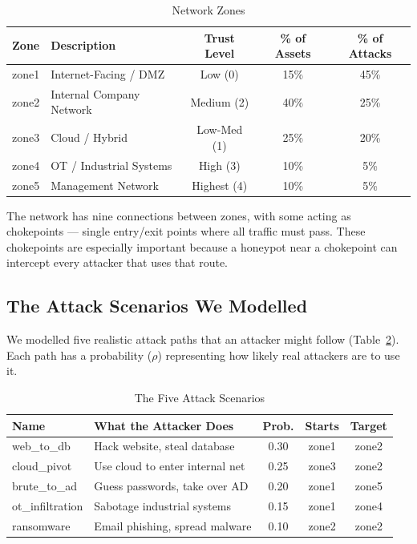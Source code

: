 \documentclass[journal]{IEEEtran}
\begin{document}
\begin{table}[htbp]
\caption{Network Zones}
\label{tab:zones}
\centering
\renewcommand{\arraystretch}{1.2}
\begin{tabular}{@{}llccc@{}}
\toprule
\textbf{Zone} & \textbf{Description} &
\textbf{Trust Level} & \textbf{\% of Assets} & \textbf{\% of Attacks} \\
\midrule
zone1 & Internet-Facing / DMZ    & Low (0)       & 15\% & 45\% \\
zone2 & Internal Company Network & Medium (2)    & 40\% & 25\% \\
zone3 & Cloud / Hybrid           & Low-Med (1)   & 25\% & 20\% \\
zone4 & OT / Industrial Systems  & High (3)      & 10\% &  5\% \\
zone5 & Management Network       & Highest (4)   & 10\% &  5\% \\
\bottomrule
\end{tabular}
\end{table}

The network has nine connections between zones, with some acting
as chokepoints --- single entry/exit points where all traffic must
pass. These chokepoints are especially important because a honeypot
near a chokepoint can intercept every attacker that uses that route.

\subsection{The Attack Scenarios We Modelled}

We modelled five realistic attack paths that an attacker might
follow (Table~\ref{tab:paths}). Each path has a probability
($\rho$) representing how likely real attackers are to use it.

\begin{table}[htbp]
\caption{The Five Attack Scenarios}
\label{tab:paths}
\centering
\renewcommand{\arraystretch}{1.2}
\begin{tabular}{@{}llccc@{}}
\toprule
\textbf{Name} & \textbf{What the Attacker Does} & \textbf{Prob.} & \textbf{Starts} & \textbf{Target} \\
\midrule
web\_to\_db      & Hack website, steal database   & 0.30 & zone1 & zone2 \\
cloud\_pivot     & Use cloud to enter internal net & 0.25 & zone3 & zone2 \\
brute\_to\_ad    & Guess passwords, take over AD  & 0.20 & zone1 & zone5 \\
ot\_infiltration & Sabotage industrial systems    & 0.15 & zone1 & zone4 \\
ransomware       & Email phishing, spread malware & 0.10 & zone2 & zone2 \\
\bottomrule
\end{tabular}
\end{table}
\end{document}
